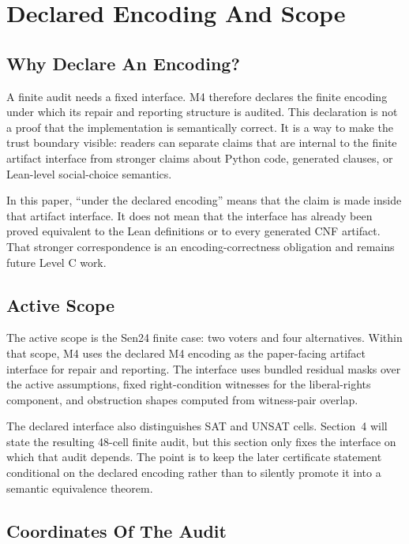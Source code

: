 \section{Declared Encoding And Scope}

\subsection*{Why Declare An Encoding?}

A finite audit needs a fixed interface. M4 therefore declares the finite
encoding under which its repair and reporting structure is audited. This
declaration is not a proof that the implementation is semantically correct.
It is a way to make the trust boundary visible: readers can separate claims
that are internal to the finite artifact interface from stronger claims about
Python code, generated clauses, or Lean-level social-choice semantics.

In this paper, ``under the declared encoding'' means that the claim is made
inside that artifact interface. It does not mean that the interface has already
been proved equivalent to the Lean definitions or to every generated CNF
artifact. That stronger correspondence is an encoding-correctness obligation
and remains future Level C work.

\subsection*{Active Scope}

The active scope is the Sen24 finite case: two voters and four alternatives.
Within that scope, M4 uses the declared M4 encoding as the paper-facing
artifact interface for repair and reporting. The interface uses bundled
residual masks over the active assumptions, fixed right-condition witnesses
for the liberal-rights component, and obstruction shapes computed from
witness-pair overlap.

The declared interface also distinguishes SAT and UNSAT cells. Section~4 will
state the resulting 48-cell finite audit, but this section only fixes the
interface on which that audit depends. The point is to keep the later
certificate statement conditional on the declared encoding rather than to
silently promote it into a semantic equivalence theorem.

\subsection*{Coordinates Of The Audit}

